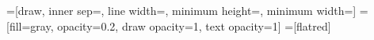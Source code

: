 \newlength{\logentryinnersep}
\setlength{\logentryinnersep}{2pt}
\newlength{\logentrylinewidth}
\setlength{\logentrylinewidth}{1pt}
\newlength{\logentrywidth}
\newcommand{\logindexcolor}{flatred}
=[draw,
                      inner sep=\logentryinnersep,
                      line width=\logentrylinewidth,
                      minimum height=\logentrywidth,
                      minimum width=\logentrywidth]
=[fill=gray, opacity=0.2, draw opacity=1, text opacity=1]
=[\logindexcolor]

\newcommand{\rightof}[1]{-\logentrylinewidth of #1}
\newcommand{\multipaxoslog}[6]{%
  \node[logentry, label={[logindex]90:0}, #2] (0) {#1};
  \node[logentry, label={[logindex]90:1}, right=\rightof{0}, #4] (1) {#3};
  \node[logentry, label={[logindex]90:2}, right=\rightof{1}, #6] (2) {#5};
}

